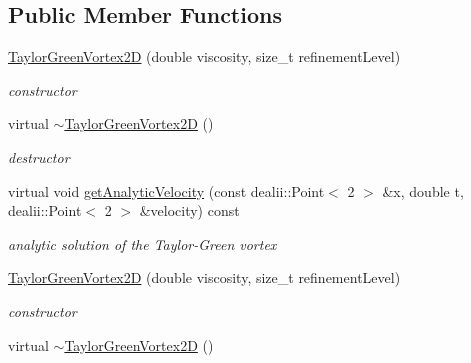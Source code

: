 \subsection*{Public Member Functions}
\begin{DoxyCompactItemize}
\item 
\hyperlink{classnatrium_1_1TaylorGreenVortex2D_a6160a6776bc13cd049945a9bbb502b6f}{Taylor\-Green\-Vortex2\-D} (double viscosity, size\-\_\-t refinement\-Level)
\begin{DoxyCompactList}\small\item\em constructor \end{DoxyCompactList}\item 
\hypertarget{classnatrium_1_1TaylorGreenVortex2D_abb6099f4f9791f7decabb35ccd3dbe49}{virtual \hyperlink{classnatrium_1_1TaylorGreenVortex2D_abb6099f4f9791f7decabb35ccd3dbe49}{$\sim$\-Taylor\-Green\-Vortex2\-D} ()}\label{classnatrium_1_1TaylorGreenVortex2D_abb6099f4f9791f7decabb35ccd3dbe49}

\begin{DoxyCompactList}\small\item\em destructor \end{DoxyCompactList}\item 
\hypertarget{classnatrium_1_1TaylorGreenVortex2D_abcc4319daac776f359408b7a1af5eb29}{virtual void \hyperlink{classnatrium_1_1TaylorGreenVortex2D_abcc4319daac776f359408b7a1af5eb29}{get\-Analytic\-Velocity} (const dealii\-::\-Point$<$ 2 $>$ \&x, double t, dealii\-::\-Point$<$ 2 $>$ \&velocity) const }\label{classnatrium_1_1TaylorGreenVortex2D_abcc4319daac776f359408b7a1af5eb29}

\begin{DoxyCompactList}\small\item\em analytic solution of the Taylor-\/\-Green vortex \end{DoxyCompactList}\item 
\hypertarget{classnatrium_1_1TaylorGreenVortex2D_a6160a6776bc13cd049945a9bbb502b6f}{\hyperlink{classnatrium_1_1TaylorGreenVortex2D_a6160a6776bc13cd049945a9bbb502b6f}{Taylor\-Green\-Vortex2\-D} (double viscosity, size\-\_\-t refinement\-Level)}\label{classnatrium_1_1TaylorGreenVortex2D_a6160a6776bc13cd049945a9bbb502b6f}

\begin{DoxyCompactList}\small\item\em constructor \end{DoxyCompactList}\item 
\hypertarget{classnatrium_1_1TaylorGreenVortex2D_a4e2a315c38f607f4fe6008dd270f3b81}{virtual \hyperlink{classnatrium_1_1TaylorGreenVortex2D_a4e2a315c38f607f4fe6008dd270f3b81}{$\sim$\-Taylor\-Green\-Vortex2\-D} ()}\label{classnatrium_1_1TaylorGreenVortex2D_a4e2a315c38f607f4fe6008dd270f3b81}


\end{DoxyCompactItemize}
